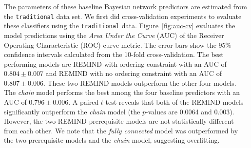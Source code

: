 \documentclass{edm_template}
\newcommand{\hl}[1]{\colorbox{yellow}{#1}}
\begin{document}
{	The parameters of these baseline Bayesian network predictors are estimated from the \texttt{traditional} data set.
	We first did cross-validation experiments to evaluate these classifiers using the \texttt{traditional} data.
	Figure~\ref{fig:auc-cv} evaluates the model predictions using  the \textit{Area Under the Curve} (AUC) of the Receiver Operating Characteristic (ROC) curve metric.
	The error bars show the $95\%$ confidence intervals calculated from the 10-fold cross-validation.
	The  best performing models are REMIND with ordering constraint with an AUC of $0.804\pm0.007$ and REMIND with no ordering constraint with an AUC of $0.807\pm0.006$. %
	These two REMIND models outperform the other four models.
	The \emph{chain} model performs the best among the four baseline predictors with an AUC of $0.796\pm0.006$.
	A paired $t$-test reveals that both of the REMIND models significantly outperform the \emph{chain} model (the $p$-values are 0.0064 and 0.003).
	However, the two REMIND prerequisite models are not statistically different from each other. 
	We note that the \emph{fully connected} model was outperformed by the two prerequisite models and the \emph{chain} model, suggesting  overfitting.%
	
	
}
\end{document}
